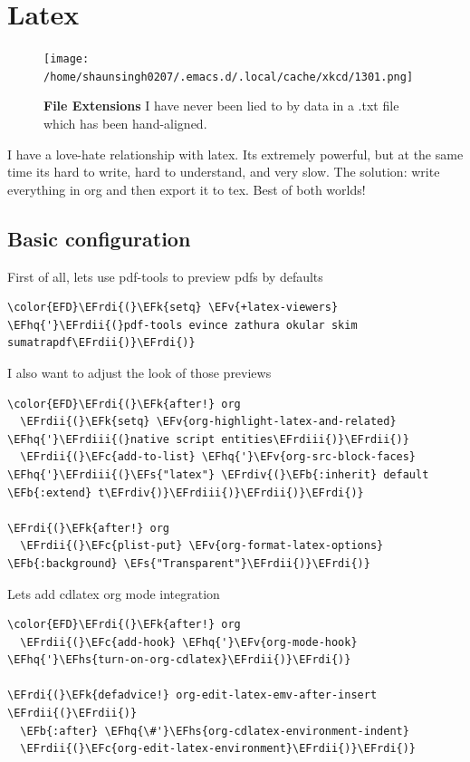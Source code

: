 \documentclass{scrartcl}
\newcommand{\EFk}[1]{\textcolor{EFk}{#1}} %
\newcommand{\EFs}[1]{\textcolor{EFs}{#1}} %
\newcommand{\EFb}[1]{\textcolor{EFb}{#1}} %
\newcommand{\EFc}[1]{\textcolor{EFc}{#1}} %
\newcommand{\EFv}[1]{\textcolor{EFv}{#1}} %
\newcommand{\EFhq}[1]{\textcolor{EFhq}{#1}} %
\newcommand{\EFhs}[1]{\textcolor{EFhs}{#1}} %
\newcommand{\EFrdi}[1]{\textcolor{EFrdi}{#1}} %
\newcommand{\EFrdii}[1]{\textcolor{EFrdii}{#1}} %
\newcommand{\EFrdiii}[1]{\textcolor{EFrdiii}{#1}} %
\newcommand{\EFrdiv}[1]{\textcolor{EFrdiv}{#1}} %
\begin{document}
\section{Latex}
\label{sec:org707b6e2}
\begin{figure}[!htb]
	  \centering
	  \texttt{[image: /home/shaunsingh0207/.emacs.d/.local/cache/xkcd/1301.png]}
  \caption*{\label{xkcd:1301} \textbf{File Extensions} I have never been lied to by data in a .txt file which has been hand-aligned.}
	\end{figure}
I have a love-hate relationship with latex. Its extremely powerful, but at the
same time its hard to write, hard to understand, and very slow. The solution:
write everything in org and then export it to tex. Best of both worlds!

\subsection{Basic configuration}
\label{sec:orgb1eead8}
First of all, lets use pdf-tools to preview pdfs by defaults
\begin{Code}
\begin{Verbatim}[]
\color{EFD}\EFrdi{(}\EFk{setq} \EFv{+latex-viewers} \EFhq{'}\EFrdii{(}pdf-tools evince zathura okular skim sumatrapdf\EFrdii{)}\EFrdi{)}
\end{Verbatim}
\end{Code}

I also want to adjust the look of those previews
\begin{Code}
\begin{Verbatim}[]
\color{EFD}\EFrdi{(}\EFk{after!} org
  \EFrdii{(}\EFk{setq} \EFv{org-highlight-latex-and-related} \EFhq{'}\EFrdiii{(}native script entities\EFrdiii{)}\EFrdii{)}
  \EFrdii{(}\EFc{add-to-list} \EFhq{'}\EFv{org-src-block-faces} \EFhq{'}\EFrdiii{(}\EFs{"latex"} \EFrdiv{(}\EFb{:inherit} default \EFb{:extend} t\EFrdiv{)}\EFrdiii{)}\EFrdii{)}\EFrdi{)}

\EFrdi{(}\EFk{after!} org
  \EFrdii{(}\EFc{plist-put} \EFv{org-format-latex-options} \EFb{:background} \EFs{"Transparent"}\EFrdii{)}\EFrdi{)}
\end{Verbatim}
\end{Code}

Lets add cdlatex org mode integration
\begin{Code}
\begin{Verbatim}[]
\color{EFD}\EFrdi{(}\EFk{after!} org
  \EFrdii{(}\EFc{add-hook} \EFhq{'}\EFv{org-mode-hook} \EFhq{'}\EFhs{turn-on-org-cdlatex}\EFrdii{)}\EFrdi{)}

\EFrdi{(}\EFk{defadvice!} org-edit-latex-emv-after-insert \EFrdii{(}\EFrdii{)}
  \EFb{:after} \EFhq{\#'}\EFhs{org-cdlatex-environment-indent}
  \EFrdii{(}\EFc{org-edit-latex-environment}\EFrdii{)}\EFrdi{)}
\end{Verbatim}
\end{Code}
\end{document}
